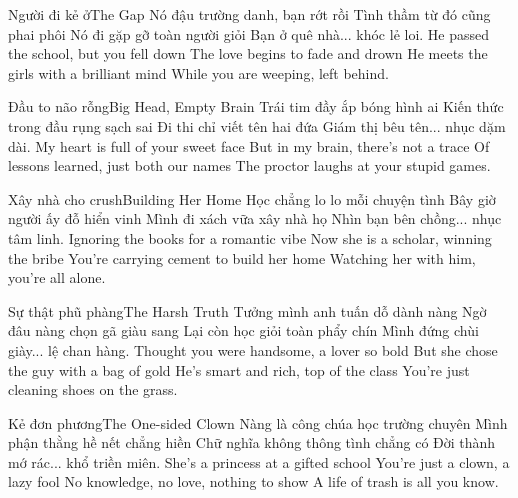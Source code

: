 \begin{tutuyetbox}{Người đi kẻ ở}{The Gap}
Nó đậu trường danh, bạn rớt rồi
Tình thầm từ đó cũng phai phôi
Nó đi gặp gỡ toàn người giỏi
Bạn ở quê nhà... khóc lẻ loi.
\tcblower
He passed the school, but you fell down
The love begins to fade and drown
He meets the girls with a brilliant mind
While you are weeping, left behind.
\end{tutuyetbox}

\begin{tutuyetbox}{Đầu to não rỗng}{Big Head, Empty Brain}
Trái tim đầy ắp bóng hình ai
Kiến thức trong đầu rụng sạch sai
Đi thi chỉ viết tên hai đứa
Giám thị bêu tên... nhục dặm dài.
\tcblower
My heart is full of your sweet face
But in my brain, there's not a trace
Of lessons learned, just both our names
The proctor laughs at your stupid games.
\end{tutuyetbox}

\begin{tutuyetbox}{Xây nhà cho crush}{Building Her Home}
Học chẳng lo lo mỗi chuyện tình
Bây giờ người ấy đỗ hiển vinh
Mình đi xách vữa xây nhà họ
Nhìn bạn bên chồng... nhục tâm linh.
\tcblower
Ignoring the books for a romantic vibe
Now she is a scholar, winning the bribe
You're carrying cement to build her home
Watching her with him, you're all alone.
\end{tutuyetbox}

\begin{tutuyetbox}{Sự thật phũ phàng}{The Harsh Truth}
Tưởng mình anh tuấn dỗ dành nàng
Ngờ đâu nàng chọn gã giàu sang
Lại còn học giỏi toàn phẩy chín
Mình đứng chùi giày... lệ chan hàng.
\tcblower
Thought you were handsome, a lover so bold
But she chose the guy with a bag of gold
He's smart and rich, top of the class
You're just cleaning shoes on the grass.
\end{tutuyetbox}

\begin{tutuyetbox}{Kẻ đơn phương}{The One-sided Clown}
Nàng là công chúa học trường chuyên
Mình phận thằng hề nết chẳng hiền
Chữ nghĩa không thông tình chẳng có
Đời thành mớ rác... khổ triền miên.
\tcblower
She's a princess at a gifted school
You're just a clown, a lazy fool
No knowledge, no love, nothing to show
A life of trash is all you know.
\end{tutuyetbox}

